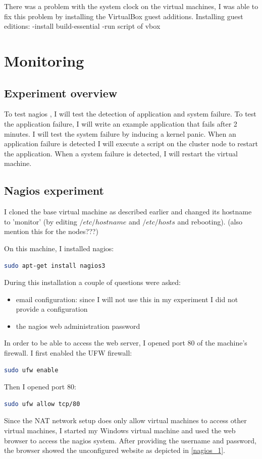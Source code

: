 \documentclass[12pt]{report}
\begin{document}
There was a problem with the system clock on the virtual machines, 
I was able to fix this problem by installing the VirtualBox guest
additions.
Installing guest editions:
-install build-essential
-run script of vbox

\section{Monitoring}
\subsection{Experiment overview}
To test nagios \cite{nagios:2013}, I will test the detection of
application and system failure. To test the application failure, I
will write an example application that fails after
2 minutes. I will test the system failure by inducing a kernel panic.
When an application failure is detected I will execute a script on the
cluster node to restart the application.
When a system failure is detected, I will restart the virtual
machine. 

\subsection{Nagios experiment}
I cloned the base virtual machine as described earlier and changed its
hostname to 'monitor' (by editing $/etc/hostname$ and $/etc/hosts$ and
rebooting). (also mention this for the nodes???)


On this machine, I installed nagios:
\begin{lstlisting}[language=bash]
 sudo apt-get install nagios3
\end{lstlisting}
During this installation a couple of questions were asked:
\begin{itemize}
\item email configuration: since I will not use this in my experiment
  I did not provide a configuration 
\item the nagios web administration password
\end{itemize}
In order to be able to access the web server, I opened port 80 of the
machine's firewall. 
I first enabled the UFW firewall:
\begin{lstlisting}[language=bash]
  sudo ufw enable
\end{lstlisting} 
Then I opened port 80:
\begin{lstlisting}[language=bash]
  sudo ufw allow tcp/80
\end{lstlisting} 
Since the NAT network setup does only allow virtual machines to access
other virtual machines, I started my Windows virtual machine and used
the web browser to access the nagios system. After providing the
username and password, the browser showed the unconfigured website as
depicted in \cref{nagios_1}.
\end{document}
